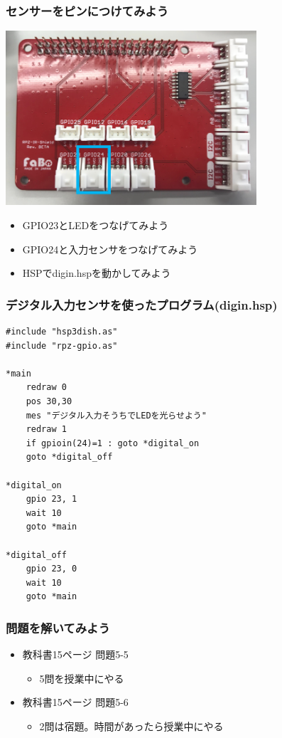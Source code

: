 \begin{frame}
    \frametitle{センサーをピンにつけてみよう}
    \begin{center}
        \includegraphics[width=0.7\textwidth]{images/chap05/text05-img029.png}
        \begin{itemize}
            \item GPIO23とLEDをつなげてみよう
            \item GPIO24と入力センサをつなげてみよう
            \item HSPでdigin.hspを動かしてみよう
        \end{itemize}
    \end{center}
\end{frame}

\begin{frame}[fragile]
    \frametitle{デジタル入力センサを使ったプログラム(digin.hsp)}
\begin{lstlisting}
#include "hsp3dish.as"
#include "rpz-gpio.as"

*main
	redraw 0
	pos 30,30
	mes "デジタル入力そうちでLEDを光らせよう"
	redraw 1
	if gpioin(24)=1 : goto *digital_on
	goto *digital_off
        
*digital_on
	gpio 23, 1
	wait 10
	goto *main

*digital_off
	gpio 23, 0
	wait 10
	goto *main 
\end{lstlisting}
\end{frame}

\begin{frame}[fragile]
    \frametitle{問題を解いてみよう}
    \begin{itemize}
        \item 教科書15ページ 問題5-5
        \begin{itemize}
            \item 5問を授業中にやる
        \end{itemize}
        \item 教科書15ページ 問題5-6
        \begin{itemize}
            \item 2問は宿題。時間があったら授業中にやる
        \end{itemize}

    \end{itemize}
\end{frame}